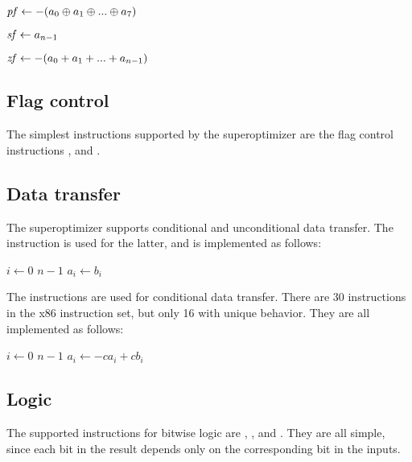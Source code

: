 \documentclass[a4paper,11pt]{kth-mag}
\renewcommand{\gets}{\leftarrow}
\newcommand{\AND}{}
\newcommand{\IOR}{+}
\newcommand{\XOR}{\oplus}
\newcommand{\NOT}{-}
\begin{document}
\begin{codebox}
\zi $\id{pf} \gets \NOT(a_0 \XOR a_1 \XOR ... \XOR a_7)$
\end{codebox}

\begin{codebox}
\zi $\id{sf} \gets a_{n-1}$
\end{codebox}

\begin{codebox}
\zi $\id{zf} \gets \NOT(a_0 \IOR a_1 \IOR ... \IOR a_{n-1})$
\end{codebox}

\subsection{Flag control}

The simplest instructions supported by the superoptimizer are the flag control instructions ,  and .

\subsection{Data transfer}

The superoptimizer supports conditional and unconditional data transfer.
The  instruction is used for the latter, and is implemented as follows:

\begin{codebox}
\zi \For $i \gets 0$ \To $n-1$
\zi \Do
      $a_i \gets b_i$
    \End
\end{codebox}

The  instructions are used for conditional data transfer.
There are 30  instructions in the x86 instruction set, but only 16 with unique behavior.
They are all implemented as follows:

\begin{codebox}
\zi \For $i \gets 0$ \To $n-1$
\zi \Do
      $a_i \gets \NOT c \AND a_i \IOR c \AND b_i$
    \End
\end{codebox}

\subsection{Logic}

The supported instructions for bitwise logic are , ,  and .
They are all simple, since each bit in the result depends only on the corresponding bit in the inputs.
\end{document}
